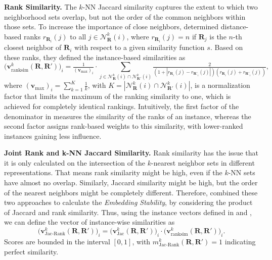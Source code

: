 \documentclass{article}
\newcommand{\citet}{\textcite}
\newcommand{\R}{\bm{R}}
\newcommand{\Rp}{\bm{R'}}
\newcommand{\subheader}{\textbf}
\begin{document}
\subheader{Rank Similarity.}
The $k$-NN Jaccard similarity captures the extent to which two neighborhood sets overlap, but not the order of the common neighbors within those sets.
To increase the importance of close neighbors, \citet{wang_towards_2020} determined distance-based ranks $r_{\R_i}(j)$ to all $j\in\mathcal{N}^k_{\R}(i)$, where $r_{\R_i}(j) = n$ if $\R_j$ is the $n$-th closest neighbor of $\R_i$ with respect to a given similarity function $s$.
Based on these ranks, they defined the instance-based similarities as
\begin{equation}\label{eq:ranksim}
    \big(\bm{v}^k_{\operatorname{ranksim}}(\R, \Rp)\big)_i = \tfrac{1}{(\bm{v}_{\max})_i}
    \cdot \textstyle\sum_{j \in \mathcal{N}^k_{\R}(i) \cap \mathcal{N}^k_{\Rp}(i)} \tfrac{2}{(1 + |r_{\R_i}(j) - r_{\Rp_i}(j)|) (r_{\R_i}(j) + r_{\Rp_i}(j))},
\end{equation}
where $(\bm{v}_{\max})_i=\textstyle\sum_{k=1}^{K}\tfrac{1}{k}$, with $K=|\mathcal{N}^k_{\R}(i) \cap \mathcal{N}^k_{\Rp}(i)|$, is a normalization factor that limits the maximum of the ranking similarity to one, which is achieved for completely identical rankings.
Intuitively, the first factor of the denominator in  measures the similarity of the ranks of an instance, whereas the second factor assigns rank-based weights to this similarity, with lower-ranked instances gaining less influence.

\subheader{Joint Rank and k-NN Jaccard Similarity.}
Rank similarity has the issue that it is only calculated on the intersection of the $k$-nearest neighbor sets in different representations.
That means rank similarity might be high, even if the $k$-NN sets have almost no overlap.
Similarly, Jaccard similarity might be high, but the order of the nearest neighbors might be completely different.
Therefore, \citet{wang_towards_2020} combined these two approaches to calculate the \emph{Embedding Stability}, by considering the product of Jaccard and rank similarity.
Thus, using the instance vectors defined in  and  , we can define the vector of instance-wise similarities as %
\begin{equation}
    \big(\bm{v}^k_{\operatorname{Jac-Rank}}(\R, \Rp)\big)_i = \big(\bm{v}_\text{Jac}^k\left(\R, \Rp\right)\big)_i \cdot \big(\bm{v}^k_{\operatorname{ranksim}}(\R, \Rp)\big)_i.
\end{equation}
Scores are bounded in the interval $[0,1]$, with $m_{\operatorname{Jac-Rank}}^k(\R, \Rp)=1$ indicating perfect similarity.
\end{document}
